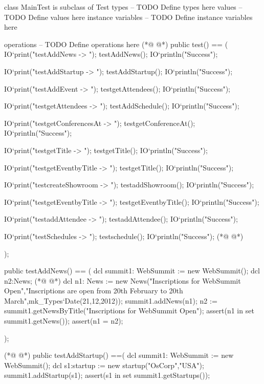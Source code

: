 \begin{vdmpp}[breaklines=true]
class MainTest is subclass of Test
types
-- TODO Define types here
values
-- TODO Define values here
instance variables
-- TODO Define instance variables here
  
operations
-- TODO Define operations here
(*@
\label{test:11}
@*)
public test() == (
  IO`print("testAddNews -> ");
  testAddNews();
  IO`println("Success");
  
  IO`print("testAddStartup -> ");
  testAddStartup();
  IO`println("Success");
     
     IO`print("testAddEvent -> ");
  testgetAttendees();
  IO`println("Success");
  
  IO`print("testgetAttendees -> ");
  testAddSchedule();
  IO`println("Success");
     
     IO`print("testgetConferencesAt -> ");
  testgetConferenceAt();
  IO`println("Success");
  
  IO`print("testgetTitle -> ");
  testgetTitle();
  IO`println("Success");
  
  IO`print("testgetEventbyTitle -> ");
  testgetTitle();
  IO`println("Success");
  
  IO`print("testcreateShowroom -> ");
  testaddShowroom();
  IO`println("Success");
  
  IO`print("testgetEventbyTitle -> ");
  testgetEventbyTitle();
  IO`println("Success");
  
  IO`print("testaddAttendee -> ");
  testaddAttendee();
  IO`println("Success");
  
   IO`print("testSchedules -> ");
  testschedule();
  IO`println("Success");
(*@
\label{testAddNews:55}
@*)
 
 
 
 );
 
 public testAddNews() == (
  dcl summit1: WebSummit := new WebSummit();
  dcl n2:News;
(*@
\label{testAddStartup:63}
@*)
  dcl n1: News := new News("Inscriptions for WebSummit Open","Inscriptions are open from 20th February to 20th March",mk_Types`Date(21,12,2012));
  summit1.addNews(n1);
  n2 := summit1.getNewsByTitle("Inscriptions for WebSummit Open");
  assert(n1 in set summit1.getNews());
  assert(n1 = n2);
 
 );
 
(*@
\label{testAddSchedule:71}
@*)
 public testAddStartup() ==(
  dcl summit1: WebSummit := new WebSummit();
  dcl s1:startup := new startup("OsCorp","USA");
  summit1.addStartup(s1);
  assert(s1 in set summit1.getStartups());
  

\end{vdmpp}
